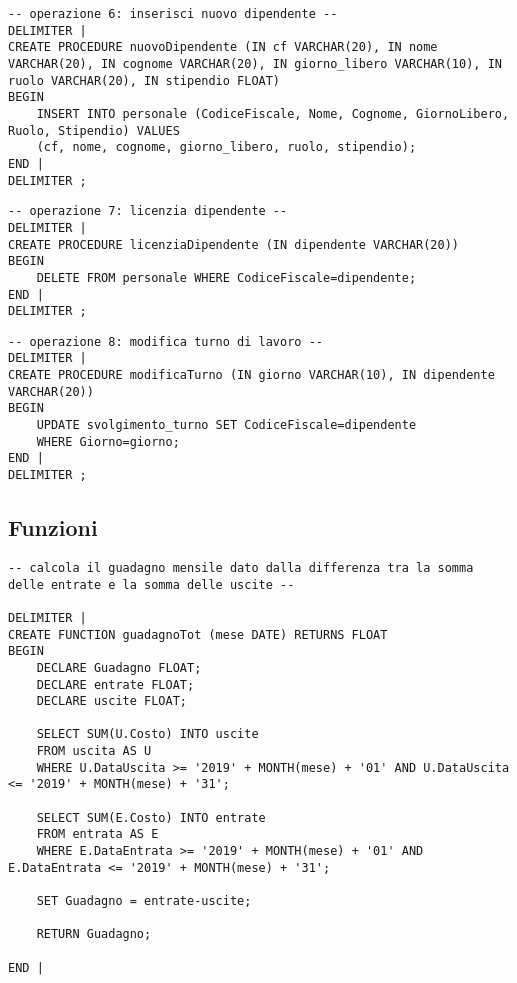 \begin{lstlisting}[title=Operazione 6, style=mysqlStyle]
-- operazione 6: inserisci nuovo dipendente --
DELIMITER |
CREATE PROCEDURE nuovoDipendente (IN cf VARCHAR(20), IN nome VARCHAR(20), IN cognome VARCHAR(20), IN giorno_libero VARCHAR(10), IN ruolo VARCHAR(20), IN stipendio FLOAT)
BEGIN
    INSERT INTO personale (CodiceFiscale, Nome, Cognome, GiornoLibero, Ruolo, Stipendio) VALUES
    (cf, nome, cognome, giorno_libero, ruolo, stipendio);
END |
DELIMITER ;
\end{lstlisting}

\begin{lstlisting}[title=Operazione 7, style=mysqlStyle]
-- operazione 7: licenzia dipendente --
DELIMITER |
CREATE PROCEDURE licenziaDipendente (IN dipendente VARCHAR(20))
BEGIN
    DELETE FROM personale WHERE CodiceFiscale=dipendente;
END |
DELIMITER ;
\end{lstlisting}

\begin{lstlisting}[title=Operazione 8, style=mysqlStyle]
    -- operazione 8: modifica turno di lavoro --
DELIMITER |
CREATE PROCEDURE modificaTurno (IN giorno VARCHAR(10), IN dipendente VARCHAR(20))
BEGIN
    UPDATE svolgimento_turno SET CodiceFiscale=dipendente
    WHERE Giorno=giorno;
END |
DELIMITER ;
\end{lstlisting}

\subsection{Funzioni} %
\begin{lstlisting}[title=Operazione 13, style=mysqlStyle]
-- calcola il guadagno mensile dato dalla differenza tra la somma delle entrate e la somma delle uscite --

DELIMITER |
CREATE FUNCTION guadagnoTot (mese DATE) RETURNS FLOAT
BEGIN 
    DECLARE Guadagno FLOAT;
    DECLARE entrate FLOAT;
    DECLARE uscite FLOAT;
    
    SELECT SUM(U.Costo) INTO uscite
    FROM uscita AS U
    WHERE U.DataUscita >= '2019' + MONTH(mese) + '01' AND U.DataUscita <= '2019' + MONTH(mese) + '31';
    
    SELECT SUM(E.Costo) INTO entrate 
    FROM entrata AS E
    WHERE E.DataEntrata >= '2019' + MONTH(mese) + '01' AND E.DataEntrata <= '2019' + MONTH(mese) + '31';
    
    SET Guadagno = entrate-uscite;
    
    RETURN Guadagno;
    
END |
\end{lstlisting}

